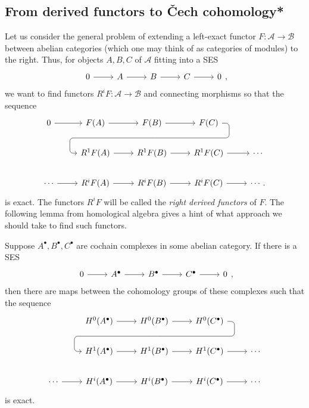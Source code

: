 \subsection{From derived functors to \v Cech cohomology*}
Let us consider the general problem of extending a left-exact
functor $F:\mathcal{A}\to\mathcal{B}$ between abelian categories
(which one may think of as categories of modules) to the right. Thus, for
objects $A,B,C$ of $\mathcal{A}$ fitting into a SES
\[\begin{tikzcd}
    0\rar & A\rar & B\rar & C\rar & 0
  \end{tikzcd},\]
we want to find functors $R^{i}F:\mathcal{A}\to\mathcal{B}$ and
connecting morphisms so that the sequence
\[
\begin{tikzcd}
  0 \rar & F(A) \rar & F(B)
  \rar\dar[phantom, ""{coordinate, name=Z}] & F(C)
  \arrow[rounded corners, to path={ -- ([xshift=2ex]\tikztostart.east)
    |- (Z) -| ([xshift=-2ex]\tikztotarget.west) -- (\tikztotarget)},
  overlay]{dll} & \\
  & R^{1}F(A)\rar & R^{1}F(B)\rar
  & R^{1}F(C)\rar & \cdots \\
  \cdots\rar & R^{i}F(A)\rar & R^{i}F(B)\rar
  & R^{i}F(C)\rar & \cdots.
\end{tikzcd}
\]
is exact. The functors $R^{i}F$ will be called the \emph{right
  derived functors} of $F$. The following lemma from homological
algebra gives a hint of what approach we should take to find such functors.
\begin{lemm}
  Suppose $A^{\bullet},B^{\bullet},C^{\bullet}$ are cochain complexes in some
  abelian category. If there is a SES
  \[\begin{tikzcd}
      0\rar & A^{\bullet}\rar & B^{\bullet}\rar & C^{\bullet}\rar & 0
    \end{tikzcd},\]
  then there are maps between the cohomology groups of these complexes
  such that the sequence
  \[\begin{tikzcd}
    & H^{0}(A^{\bullet}) \rar & H^{0}(B^{\bullet})
    \rar\dar[phantom, ""{coordinate, name=Z}] & H^{0}(C^{\bullet})
    \arrow[rounded corners, to path={ -- ([xshift=2ex]\tikztostart.east)
      |- (Z) -| ([xshift=-2ex]\tikztotarget.west) -- (\tikztotarget)},
    overlay]{dll} & \\
    & H^{1}(A^{\bullet}) \rar & H^{1}(B^{\bullet})\rar
    & H^{1}(C^{\bullet}) \rar & \cdots \\
    \cdots \rar& H^{i}(A^{\bullet}) \rar & H^{i}(B^{\bullet})\rar
    & H^{i}(C^{\bullet}) \rar & \cdots
    \end{tikzcd}\]
  is exact.
\end{lemm}
